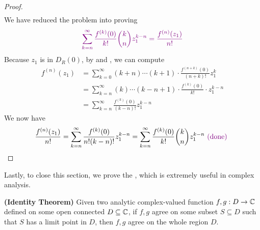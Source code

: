 \documentclass{report}
\begin{document}
\begin{proof}
\begin{align*}
\end{align*}
We have reduced the problem into proving 
\begin{align*}
\textcolor{violet}{\sum_{k=n}^\infty \frac{f^{(k)}(0)}{k!} \binom{k}{n}z_1^{k-n}=\frac{f^{(n)}(z_1)}{n!}}
\end{align*}
Because $z_1$ is in $D_R(0)$, by  and , we can compute 
\begin{align*}
f^{(n)}(z_1)&=\sum_{k=0}^{\infty}(k+n)\cdots (k+1)\cdot  \frac{f^{(n+k)}(0)}{(n+k)!}z_1^{k}\\
&=\sum_{k=n}^\infty (k)\cdots (k-n+1) \cdot \frac{f^{(k)}(0)}{k!} \cdot z_1^{k-n}\\
&=\sum _{k=n}^{\infty}\frac{f^{(k)}(0)}{(k-n)!}z_1^{k-n}
\end{align*}
We now have 
\begin{align*}
\frac{f^{(n)}(z_1)}{n!}= \sum_{k=n}^{\infty} \frac{f^{(k)}(0)}{n!(k-n)!}z_1^{k-n}= \sum_{k=n}^{\infty} \frac{f^{(k)}(0)}{k!}\binom{k}{n}z_1^{k-n} \textcolor{violet}{\text{ (done) }}
\end{align*}
\end{proof}
\begin{mdframed}
Lastly, to close this section, we prove the , which is extremely useful in complex analysis. 
\end{mdframed}
\begin{theorem}
\label{Identity Theorem}
\textbf{(Identity Theorem)} Given two analytic complex-valued function $f,g:D\rightarrow \mathbb{C}$ defined on some open connected $D\subseteq \mathbb{C}$, if $f,g$ agree on some subset $S \subseteq D$ such that $S$ has a limit point in $D$, then  $f,g$ agree on the whole region $D$.
\end{theorem}
\end{document}

